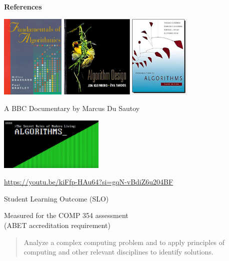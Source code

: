 \begin{frame}
{\bf References}

\includegraphics[height=4cm]{Figures/brassard.jpg}
\includegraphics[height=4cm]{Figures/kleinberg.jpg}
\includegraphics[height=4cm]{Figures/cormen.jpg}

\end{frame}

\begin{frame}
A BBC Documentary by Marcus Du Sautoy

\includegraphics[width=5cm]{Figures/algorithms-bbc.png}

\url{https://youtu.be/kiFfp-HAu64?si=gqN-vBdiZ6u204BF}
\end{frame}

\begin{frame}
{Student Learning Outcome (SLO)}

Measured for the COMP 354 assessment \\
(ABET accreditation requirement)

\bigskip\bigskip

\begin{quote}
\raggedright
Analyze a complex computing problem and to apply principles of
computing and other relevant disciplines to identify solutions.
\end{quote}
\end{frame}

